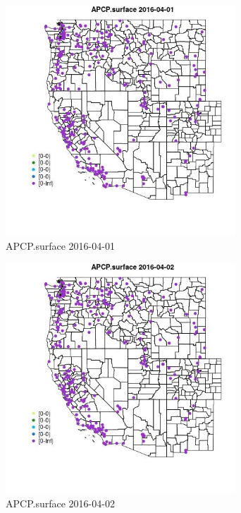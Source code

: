 \begin{figure} 
\centering  
\includegraphics[width=0.77\textwidth]{Code_Outputs/Report_ML_input_PM25_Step4_part_e_de_duplicated_aveswNAs_MapObsAPCPsurface2016-04-01.jpg} 
\caption{\label{fig:Report_ML_input_PM25_Step4_part_e_de_duplicated_aveswNAsMapObsAPCPsurface2016-04-01}APCP.surface 2016-04-01} 
\end{figure} 
 

\begin{figure} 
\centering  
\includegraphics[width=0.77\textwidth]{Code_Outputs/Report_ML_input_PM25_Step4_part_e_de_duplicated_aveswNAs_MapObsAPCPsurface2016-04-02.jpg} 
\caption{\label{fig:Report_ML_input_PM25_Step4_part_e_de_duplicated_aveswNAsMapObsAPCPsurface2016-04-02}APCP.surface 2016-04-02} 
\end{figure} 
 

